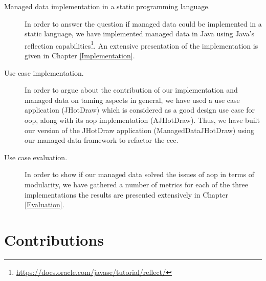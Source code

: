 \begin{description}

  \item[Managed data implementation in a static programming language.]
  In order to answer the question if managed data could be implemented in a static language, we have implemented managed data in Java 
  using Java's reflection capabilities\footnote{\url{https://docs.oracle.com/javase/tutorial/reflect/}}. 
  An extensive presentation of the implementation is given in Chapter \ref{Implementation}.

  \item[Use case implementation.] 
  In order to argue about the contribution of our implementation and managed data on taming aspects in general, we have used a use case application (JHotDraw) which is considered as a good design use case for \ac{oop}, along with its \ac{aop} implementation (AJHotDraw).
  Thus, we have built our version of the JHotDraw application (ManagedDataJHotDraw) using our managed data framework to refactor the \ac{ccc}.

  \item[Use case evaluation.]
  In order to show if our managed data solved the issues of \ac{aop} in terms of modularity, we have gathered a number of metrics for each of the three implementations the results are presented extensively in Chapter \ref{Evaluation}.

\end{description}	

\section{Contributions}\label{Contributions}

